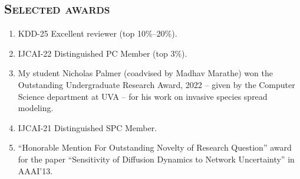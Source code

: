 \documentclass[margin,10pt]{res} %
\begin{document}
\begin{resume}
\section{\textnormal{\textsc{Selected awards}}}
\begin{enumerate}[$\circ$]
    \item KDD-25 Excellent reviewer (top 10\%--20\%).
    \item IJCAI-22 Distinguished PC Member (top 3\%).
\item My student Nicholas Palmer (coadvised by Madhav Marathe) won the
Outstanding Undergraduate Research Award, 2022 -- given by the Computer
Science department at UVA -- for his work on invasive species spread
modeling.
    \item IJCAI-21 Distinguished SPC Member.
\item ``Honorable Mention For Outstanding Novelty of Research
Question'' award for the paper ``Sensitivity of Diffusion Dynamics to
Network Uncertainty'' in AAAI'13.
\end{enumerate}

\end{resume}
\end{document}
